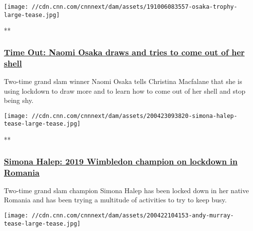 \href{/videos/sports/2020/05/12/naomi-osaka-time-out-tennis-workouts-drawing-jay-z-beyonce-spt-intl-lon-orig-cmd.cnn}{}

\texttt{[image: //cdn.cnn.com/cnnnext/dam/assets/191006083557-osaka-trophy-large-tease.jpg]}

**

\hypertarget{time-out-naomi-osaka-draws-and-tries-to-come-out-of-her-shell}{%
\subsubsection{\texorpdfstring{\href{/videos/sports/2020/05/12/naomi-osaka-time-out-tennis-workouts-drawing-jay-z-beyonce-spt-intl-lon-orig-cmd.cnn}{Time
Out: Naomi Osaka draws and tries to come out of her
shell}}{Time Out: Naomi Osaka draws and tries to come out of her shell}}\label{time-out-naomi-osaka-draws-and-tries-to-come-out-of-her-shell}}

Two-time grand slam winner Naomi Osaka tells Christina Macfalane that
she is using lockdown to draw more and to learn how to come out of her
shell and stop being shy.

\href{/videos/sports/2020/04/23/simona-halep-home-lockdown-romania-workouts-tennis-wimbledon-spt-intl-lon-orig.cnn}{}

\texttt{[image: //cdn.cnn.com/cnnnext/dam/assets/200423093820-simona-halep-tease-large-tease.jpg]}

**

\hypertarget{simona-halep-2019-wimbledon-champion-on-lockdown-in-romania}{%
\subsubsection{\texorpdfstring{\href{/videos/sports/2020/04/23/simona-halep-home-lockdown-romania-workouts-tennis-wimbledon-spt-intl-lon-orig.cnn}{Simona
Halep: 2019 Wimbledon champion on lockdown in
Romania}}{Simona Halep: 2019 Wimbledon champion on lockdown in Romania}}\label{simona-halep-2019-wimbledon-champion-on-lockdown-in-romania}}

Two-time grand slam champion Simona Halep has been locked down in her
native Romania and has been trying a multitude of activities to try to
keep busy.

\href{/videos/sports/2020/04/22/andy-murray-time-out-seeing-kids-yoga-tennis-not-returning-spt-intl-lon-orig.cnn}{}

\texttt{[image: //cdn.cnn.com/cnnnext/dam/assets/200422104153-andy-murray-tease-large-tease.jpg]}

